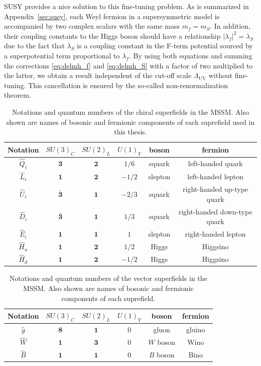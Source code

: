 \documentclass[12pt,twoside,book]{article}
\begin{document}
SUSY provides a nice solution to this fine-tuning problem.
As is summarized in Appendix~\ref{sec:susy}, each Weyl fermion in a supersymmetric model is accompanied by two complex scalars with the same mass $m_f = m_S$.
In addition, their coupling constants to the Higgs boson should have a relationship $|\lambda_f|^2 = \lambda_S$ due to the fact that $\lambda_S$ is a coupling constant in the F-term potential sourced by a superpotential term proportional to $\lambda_f$.
By using both equations and summing the corrections \eqref{eq:delmh_f} and \eqref{eq:delmh_S} with a factor of two multiplied to the latter, we obtain a result independent of the cut-off scale $\Lambda_{\mathrm{UV}}$ without fine-tuning.
This cancellation is ensured by the so-called non-renormalization theorem. \cite{Salam:1974jj, Grisaru:1979wc}

\begin{table}[t]
  \centering
  \begin{tabular}{c|ccc|cc}
    Notation & $SU(3)_C$ & $SU(2)_L$ & $U(1)_Y$ & boson & fermion \\ \hline
    $\hat{Q}_i$ & $\bm{3}$ & $\bm{2}$ & $1/6$ & squark & left-handed quark \\
    $\hat{L}_i$ & $\bm{1}$ & $\bm{2}$ & $-1/2$ & slepton & left-handed lepton \\
    $\hat{U}_i$ & $\bar{\bm{3}}$ & $\bm{1}$ & $-2/3$ & squark & right-handed up-type quark \\
    $\hat{D}_i$ & $\bar{\bm{3}}$ & $\bm{1}$ & $1/3$ & squark & right-handed down-type quark \\
    $\hat{E}_i$ & $\bm{1}$ & $\bm{1}$ & $1$ & slepton & right-handed lepton\\
    $\hat{H}_u$ & $\bm{1}$ & $\bm{2}$ & $1/2$ & Higgs & Higgsino\\
    $\hat{H}_d$ & $\bm{1}$ & $\bm{2}$ & $-1/2$ & Higgs & Higgsino
  \end{tabular}
  \caption{
    Notations and quantum numbers of the chiral superfields in the MSSM.
    Also shown are names of bosonic and fermionic components of each suprefield used in this thesis.
  }
  \label{tab:mssm_csf}
\end{table}

\begin{table}[t]
  \centering
  \begin{tabular}{c|ccc|cc}
    Notation & $SU(3)_C$ & $SU(2)_L$ & $U(1)_Y$ & boson & fermion \\ \hline
    $\hat{g}$ & $\bm{8}$ & $\bm{1}$ & $0$ & gluon & gluino \\
    $\hat{W}$ & $\bm{1}$ & $\bm{3}$ & $0$ & $W$ boson & Wino\\
    $\hat{B}$ & $\bm{1}$ & $\bm{1}$ & $0$ & $B$ boson & Bino\\
  \end{tabular}
  \caption{
    Notations and quantum numbers of the vector superfields in the MSSM.
    Also shown are names of bosonic and fermionic components of each suprefield.}
  \label{tab:mssm_vsf}
\end{table}
\end{document}
